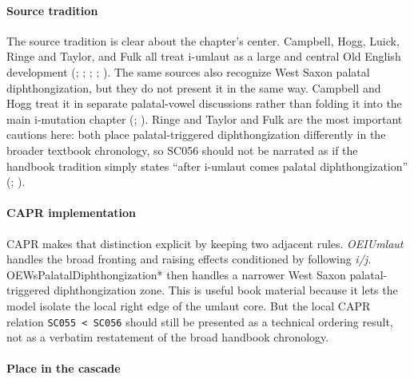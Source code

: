 \documentclass[
  british,
  a4paper,
]{article}
\begin{document}
\paragraph{Source tradition}\label{source-tradition-34}

The source tradition is clear about the chapter's center. Campbell,
Hogg, Luick, Ringe and Taylor, and Fulk all treat i-umlaut as a large
and central Old English development
(;
;
;
; ). The same
sources also recognize West Saxon palatal diphthongization, but they do
not present it in the same way. Campbell and Hogg treat it in separate
palatal-vowel discussions rather than folding it into the main
i-mutation chapter (; ). Ringe and Taylor and
Fulk are the most important cautions here: both place palatal-triggered
diphthongization differently in the broader textbook chronology, so
SC056 should not be narrated as if the handbook tradition simply states
``after i-umlaut comes palatal diphthongization''
(; ).

\paragraph{CAPR implementation}\label{capr-implementation-34}

CAPR makes that distinction explicit by keeping two adjacent rules.
\emph{OEIUmlaut} handles the broad fronting and raising effects
conditioned by following \emph{i/j. }OEWsPalatalDiphthongization* then
handles a narrower West Saxon palatal-triggered diphthongization zone.
This is useful book material because it lets the model isolate the local
right edge of the umlaut core. But the local CAPR relation
\texttt{SC055\ \textless{}\ SC056} should still be presented as a
technical ordering result, not as a verbatim restatement of the broad
handbook chronology.

\paragraph{Place in the cascade}\label{place-in-the-cascade-34}
\end{document}
